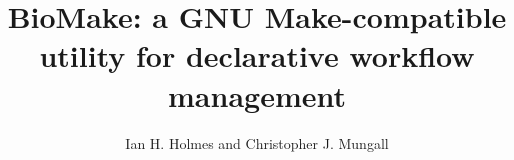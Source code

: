 \documentclass{article}
\begin{document}
\newcommand\structabs[5]{\maketitle \abstract{#1 #2 #3 Contact: #4}}

\title{BioMake: a GNU Make-compatible utility for declarative workflow management}
\author{Ian H. Holmes and Christopher J. Mungall}


\end{document}
